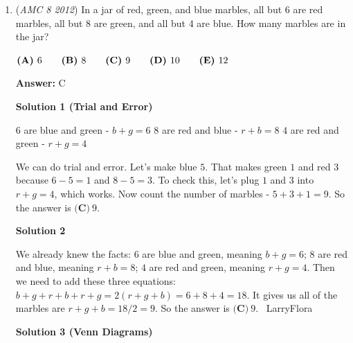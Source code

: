 \begin{enumerate}
 \textbf{Answer: }A



\textbf{Solution}

The problem states that the answer cannot be a perfect square or have prime factors less than $50$. Therefore, the answer will be the product of at least two different primes greater than $50$. The two smallest primes greater than $50$ are $53$ and $59$. Multiplying these two primes, we obtain the number $3127$, which is also the smallest number on the list of answer choices. 

 So we are done, and the answer is $\boxed{\textbf{(A)}\ 3127}$.

 


	\item (\textit{AMC 8 2012}) In a jar of red, green, and blue marbles, all but 6 are red marbles, all but 8 are green, and all but 4 are blue. How many marbles are in the jar?


 $\textbf{(A)}\hspace{.05in}6\qquad\textbf{(B)}\hspace{.05in}8\qquad\textbf{(C)}\hspace{.05in}9\qquad\textbf{(D)}\hspace{.05in}10\qquad\textbf{(E)}\hspace{.05in}12$

 \textbf{Answer: }C



\textbf{Solution 1 (Trial and Error)}

$6$ are blue and green - $b+g=6$
$8$ are red and blue - $r+b=8$
$4$ are red and green - $r+g=4$

 
We can do trial and error. Let's make blue $5$. That makes green $1$ and red $3$ because $6-5=1$ and $8-5=3$. To check this, let's plug $1$ and $3$ into $r+g=4$, which works. Now count the number of marbles - $5+3+1=9$. So the answer is $\boxed{\textbf{(C)}\ 9}.$




\textbf{Solution 2}

We already knew the facts: $6$ are blue and green, meaning $b+g=6$; $8$ are red and blue, meaning $r+b=8$; $4$ are red and green, meaning $r+g=4$. Then we need to add these three equations: $b+g+r+b+r+g=2(r+g+b)=6+8+4=18$. It gives us all of the marbles are $r+g+b = 18/2 = 9$. So the answer is $\boxed{\textbf{(C)}\ 9}$.  ~LarryFlora

 



\textbf{Solution 3 (Venn Diagrams)}


\end{enumerate}

